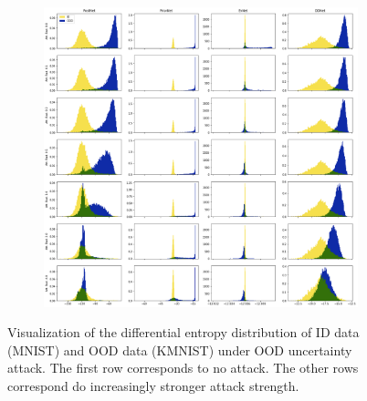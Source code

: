 \begin{figure}[ht!]
    \centering
        \begin{subfigure}[t]{1.0\textwidth}
        \centering
        \includegraphics[width=0.99 \textwidth]{sections/008_icml2021/eval/unc_dist_unc_ood_mnist_c.png}
    \end{subfigure}%
    \caption{Visualization of the differential entropy distribution of ID data (MNIST) and OOD data (KMNIST) under OOD uncertainty attack. The first row corresponds to no attack. The other rows correspond do increasingly stronger attack strength.}
    \label{fig:attaked_samples_idood_mnist}
	\vspace{-.5cm}
\end{figure}


